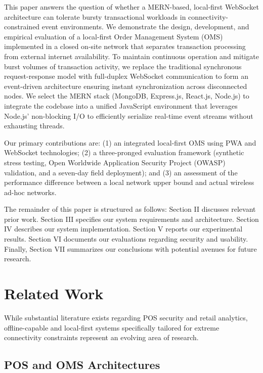 \documentclass[conference]{IEEEtran}
\begin{document}
This paper answers the question of whether a MERN-based, local-first WebSocket architecture can tolerate bursty transactional workloads in connectivity-constrained event environments. We demonstrate the design, development, and empirical evaluation of a local-first Order Management System (OMS) implemented in a closed on-site network that separates transaction processing from external internet availability. To maintain continuous operation and mitigate burst volumes of transaction activity, we replace the traditional synchronous request-response model with full-duplex WebSocket communication \cite{fette2011websocket} to form an event-driven architecture ensuring instant synchronization across disconnected nodes. We select the MERN stack (MongoDB, Express.js, React.js, Node.js) to integrate the codebase into a unified JavaScript environment that leverages Node.js' non-blocking I/O to efficiently serialize real-time event streams without exhausting threads.

Our primary contributions are: (1) an integrated local-first OMS using PWA and WebSocket technologies; (2) a three-pronged evaluation framework (synthetic stress testing, Open Worldwide Application Security Project (OWASP) validation, and a seven-day field deployment); and (3) an assessment of the performance difference between a local network upper bound and actual wireless ad-hoc networks.

The remainder of this paper is structured as follows: Section II discusses relevant prior work. Section III specifies our system requirements and architecture. Section IV describes our system implementation. Section V reports our experimental results. Section VI documents our evaluations regarding security and usability. Finally, Section VII summarizes our conclusions with potential avenues for future research.

\section{Related Work}

While substantial literature exists regarding POS security and retail analytics, offline-capable and local-first systems specifically tailored for extreme connectivity constraints represent an evolving area of research.

\subsection{POS and OMS Architectures}
\end{document}
